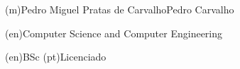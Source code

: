 
%



\ncauthorname(m){Pedro Miguel Pratas de Carvalho}{Pedro Carvalho}

\ncmajorfield(en){Computer Science and Computer Engineering}


\ncauthordegree(en){BSc} 
\ncauthordegree(pt){Licenciado}




